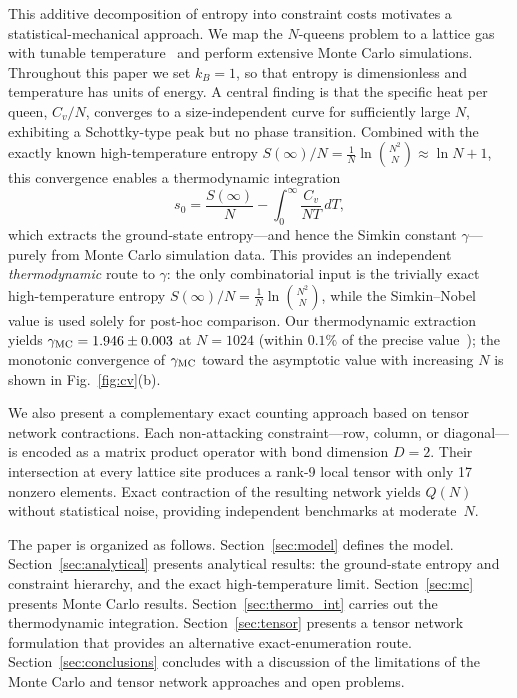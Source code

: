 \documentclass[aps, pre, reprint, amsmath, amssymb, superscriptaddress, floatfix]{revtex4-2}
\begin{document}
This additive decomposition of entropy into constraint costs motivates
a statistical-mechanical approach.  We map the $N$-queens
problem to a lattice gas with tunable
temperature~\cite{Zhang2009,Polson2024,Reynolds2019} and perform extensive Monte
Carlo simulations.  Throughout this paper we set $k_B = 1$, so that
entropy is dimensionless and temperature has units of energy.
A central finding is that the specific heat per
queen, $C_v/N$, converges to a size-independent curve for
sufficiently large $N$, exhibiting a Schottky-type peak but no phase
transition.  Combined with the exactly known high-temperature entropy
$S(\infty)/N = \frac{1}{N}\ln\binom{N^2}{N} \approx \ln N + 1$,
this convergence enables a thermodynamic integration
\begin{equation*}
  s_0 = \frac{S(\infty)}{N} - \int_0^\infty \frac{C_v}{NT}\,dT,
\end{equation*}
which extracts the ground-state entropy---and hence the Simkin
constant $\gamma$---purely from Monte Carlo simulation data.
This provides an independent \emph{thermodynamic} route to $\gamma$:
the only combinatorial input is the trivially exact high-temperature
entropy $S(\infty)/N = \frac{1}{N}\ln\binom{N^2}{N}$, while the
Simkin--Nobel value is used solely for post-hoc comparison.
Our thermodynamic extraction yields $\gamma_{\rm MC} = 1.946 \pm 0.003$ at
$N = 1024$ (within $0.1\%$ of the precise value~\cite{Nobel2023});
the monotonic convergence of $\gamma_{\rm MC}$ toward the asymptotic
value with increasing $N$ is shown in Fig.~\ref{fig:cv}(b).

We also present a complementary exact counting approach based on tensor
network contractions.  Each non-attacking constraint---row, column, or
diagonal---is encoded as a matrix product operator with bond
dimension $D = 2$.  Their intersection at every lattice site produces
a rank-9 local tensor with only 17 nonzero elements.  Exact
contraction of the resulting network yields $Q(N)$ without
statistical noise, providing independent benchmarks at moderate~$N$.

The paper is organized as follows.
Section~\ref{sec:model} defines the model.
Section~\ref{sec:analytical} presents analytical results: the
ground-state entropy and constraint hierarchy, and the exact
high-temperature limit.
Section~\ref{sec:mc} presents Monte Carlo results.
Section~\ref{sec:thermo_int} carries out the thermodynamic integration.
Section~\ref{sec:tensor} presents a tensor network formulation that
provides an alternative exact-enumeration route.
Section~\ref{sec:conclusions} concludes with a discussion of the limitations of the Monte Carlo and tensor network approaches and open problems.
\end{document}
